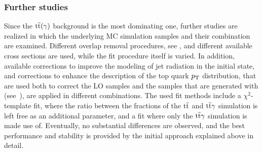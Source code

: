 \subsubsection*{Further studies}
Since the ${\mathrm{t}\overline{\mathrm{t}}}(\gamma)$ background is the most dominating one, further studies are realized in which the underlying MC simulation samples and their combination are examined. Different overlap removal procedures, see , and different available cross sections are used, while the fit procedure itself is varied. In addition, available corrections to improve the modeling of jet radiation in the initial state, and corrections to enhance the description of the top quark $p_{\mathrm{T}}$ distribution, that are used both to correct the LO samples and the samples that are generated with \POWHEG (see~), are applied in different combinations. The used fit methods include a $\chi^2$-template fit, where the ratio between the fractions of the ${\mathrm{t}\overline{\mathrm{t}}}$ and ${\mathrm{t}\overline{\mathrm{t}}}\gamma$ simulation is left free as an additional parameter, and a fit where only the ${\mathrm{t}\overline{\mathrm{t}}}\gamma$ simulation is made use of. Eventually, no substantial differences are observed, and the best performance and stability is provided by the initial approach explained above in detail.

